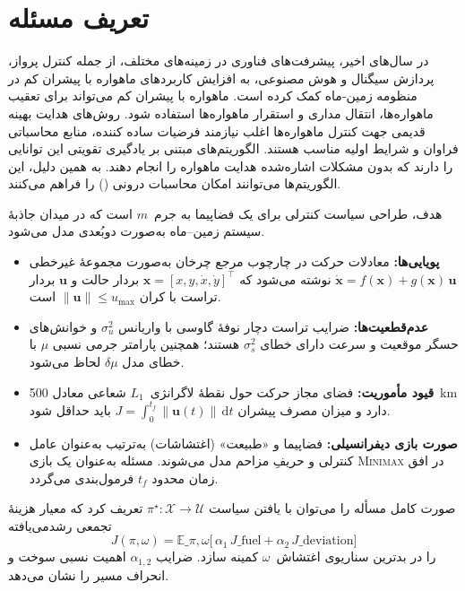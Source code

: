 \section{تعریف مسئله}\label{sec:problem_statement}
\noindent  در سال‌های اخیر، پیشرفت‌های فناوری در زمینه‌های مختلف، از جمله کنترل پرواز، پردازش سیگنال و هوش مصنوعی، به افزایش کاربردهای ماهواره با پیشران کم در منظومه زمین‐ماه کمک کرده است. ماهواره با پیشران کم می‌تواند برای تعقیب ماهواره‌ها، انتقال مداری و استقرار ماهواره‌ها استفاده شود.
روش‌های هدایت بهینه قدیمی جهت کنترل ماهواره‌ها اغلب نیازمند فرضیات ساده کننده، منابع محاسباتی فراوان و شرایط اولیه مناسب هستند. الگوریتم‌های مبتنی بر یادگیری تقویتی این توانایی را دارند که بدون مشکلات اشاره‌شده هدایت ماهواره را انجام دهند. به همین دلیل، این الگوریتم‌ها می‌توانند امکان محاسبات درونی 
()  
را فراهم می‌کنند.



هدف، طراحی سیاست کنترلی برای یک فضاپیما به جرم~$m$ است که در میدان جاذبهٔ سیستم زمین–ماه به‌صورت دوبُعدی مدل می‌شود. 

\begin{itemize}
	\item \textbf{پویایی‌ها:} معادلات حرکت در چارچوب مرجع چرخان به‌صورت مجموعهٔ غیرخطی \mbox{$\dot{\mathbf{x}} = f(\mathbf{x}) + g(\mathbf{x})\,\mathbf{u}$} نوشته می‌شود که $\mathbf{x}\!=\![x,y,\dot x,\dot y]^\top$ بردار حالت و $\mathbf{u}$ بردار تراست با کران $\|\mathbf{u}\|\le u_{\max}$ است.
	\item \textbf{عدم‌قطعیت‌ها:} ضرایب تراست دچار نوفهٔ گاوسی با واریانس \mbox{$\sigma_u^2$} و خوانش‌های حسگر موقعیت و سرعت دارای خطای \mbox{$\sigma_s^2$} هستند؛ همچنین پارامتر جرمی نسبی $\mu$ با خطای مدل \mbox{$\delta\mu$} لحاظ می‌شود.
	\item \textbf{قیود مأموریت:} فضای مجاز حرکت حول نقطهٔ لاگرانژی~$L_1$ شعاعی معادل 500~km دارد و میزان مصرف پیشران \mbox{$J = \int_0^{t_f}\|\mathbf{u}(t)\|\,\mathrm dt$} باید حداقل شود.
	\item \textbf{صورت بازی دیفرانسیلی:} فضاپیما و «طبیعت» (اغتشاشات) به‌ترتیب به‌عنوان عامل کنترلی و حریفِ مزاحم مدل می‌شوند. مسئله به‌عنوان یک بازی \textsc{Minimax} در افق زمان محدود \mbox{$t_f$} فرمول‌بندی می‌گردد.
\end{itemize}

صورت کامل مسأله را می‌توان با یافتن سیاست \mbox{$\pi^\star : \mathcal{X}\to \mathcal{U}$} تعریف کرد که معیار هزینهٔ تجمعی رشدمی‌یافته 
\[ J(\pi,\omega) = \mathbb{E}\_{\pi,\omega}\Big[\,\alpha_1\,J\_{\text{fuel}} + \alpha_2\,J\_{\text{deviation}}\Big] \]
را در بدترین سناریوی اغتشاش~$\omega$ کمینه سازد. ضرایب $\alpha_{1,2}$ اهمیت نسبی سوخت و انحراف مسیر را نشان می‌دهد.
